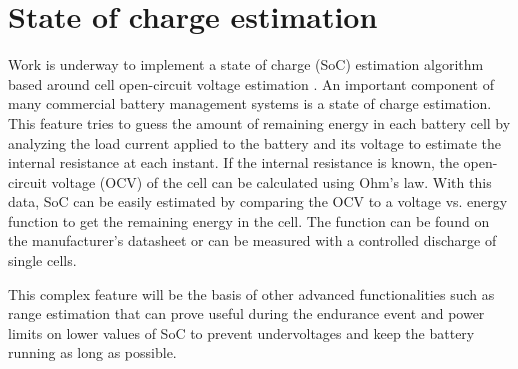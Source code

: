 \section{State of charge estimation}
Work is underway to implement a state of charge (SoC) estimation algorithm based around cell open-circuit voltage estimation \cite{soc}.
An important component of many commercial battery management systems is a state of charge estimation. This feature tries to guess the amount of remaining energy in each battery cell by analyzing the load current applied to the battery and its voltage to estimate the internal resistance at each instant. If the internal resistance is known, the open-circuit voltage (OCV) of the cell can be calculated using Ohm's law. With this data, SoC can be easily estimated by comparing the OCV to a voltage vs. energy function to get the remaining energy in the cell. The function can be found on the manufacturer's datasheet or can be measured with a controlled discharge of single cells.

This complex feature will be the basis of other advanced functionalities such as range estimation that can prove useful during the endurance event and power limits on lower values of SoC to prevent undervoltages and keep the battery running as long as possible.

